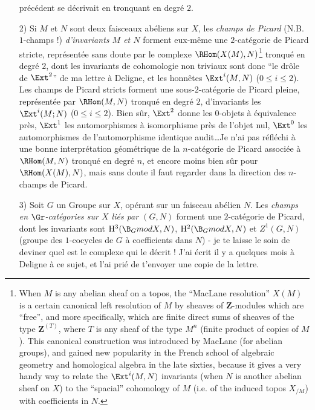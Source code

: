 \begin{enumerate}
précédent se décrivait en tronquant en degré $2$.
    
\item[2)]\label{it:app1.2} Si $M$ et $N$ sont deux faisceaux abéliens sur $X$, les \emph{champs de Picard} (N.B. $1$-champs !) \emph{d'invariants $M$ et $N$} forment eux-même une $2$-catégorie de Picard stricte, représentée sans doute par le complexe $\RHom(X(M), N)$\footnote{When $M$ is any abelian sheaf on a topos, the ``MacLane resolution'' $X(M)$ is a certain canonical left resolution of $M$ by sheaves of $\mathbf{Z}$-modules which are ``free'', and more specifically, which are finite direct sums of sheaves of the type $\mathbf{Z}^{(T)}$, where $T$ is any sheaf of the type $M^n$ (finite product of copies of $M$). This canonical construction was introduced by MacLane (for abelian groups), and gained new popularity in the French school of algebraic geometry and homological algebra in the late sixties, because it gives a very handy way to relate the $\Ext^i(M, N)$ invariants (when $N$ is another abelian sheaf on $X$) to the ``spacial'' cohomology of $M$ (i.e. of the induced topos $X_{/M}$) with coefficients in $N$.} tronqué en degré $2$, dont les invariants de cohomologie non triviaux sont donc ``le drôle de $\Ext^2$'' de ma lettre à Deligne, et les honnêtes $\Ext^i(M, N)$ ($0 \leq i \leq 2$). Les champs de Picard stricts forment une sous-$2$-catégorie de Picard pleine, représentée par $\RHom(M, N)$ tronqué en degré $2$, d'invariants les $\Ext^i(M; N)$ ($0 \leq i \leq 2$). Bien sûr, $\Ext^2$ donne les $0$-objets à équivalence près, $\Ext^1$ les automorphismes à isomorphisme près de l'objet nul, $\Ext^0$ les automorphismes de l'automorphisme identique audit\dots Je n'ai pas réfléchi à une bonne interprétation géométrique de la $n$-catégorie de Picard associée à $\RHom(M, N)$ tronqué en degré $n$, et encore moins bien sûr pour $\RHom(X(M), N)$, mais sans doute il faut regarder dans la direction des $n$-champs de Picard. 
    
\item[3)]\label{it:app1.3} Soit $G$ un Groupe sur $X$, opérant sur un faisceau abélien $N$. Les \emph{champs en $\Gr$-catégories sur $X$ liés par $(G, N)$} forment une $2$-catégorie de Picard, dont les invariants sont $\mathrm H^3(\B_G mod X, N)$, $\mathrm H^2(\B_G mod X, N)$ et $Z^1(G, N)$ (groupe des $1$-cocycles de $G$ à coefficients dans $N$) - je te laisse le soin de deviner quel est le complexe qui le décrit ! J'ai écrit il y a quelques mois à Deligne à ce sujet, et l'ai prié de t'envoyer une copie de la lettre.
    

\end{enumerate}
